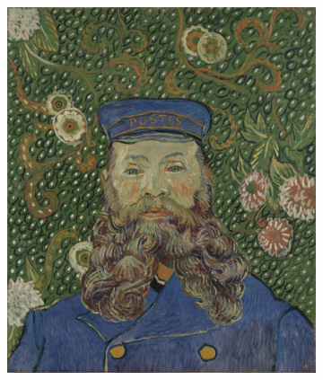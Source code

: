 \begin{frame}
\begin{figure}[H]
\begin{subfigure}[h]{0.32\textwidth}
            \includegraphics[width=\textwidth]{resources/content/style/portrait_of_joseph_roulin.jpg}
        \end{subfigure}
    

\end{figure}
\end{frame}
